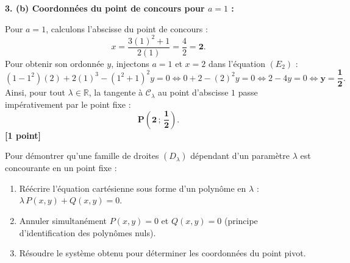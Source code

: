 \documentclass[11pt,a4paper]{article}
\newcommand{\R}{\mathbb{R}}
\begin{document}
\begin{correctionbox}
\medskip
\textbf{3. (b) Coordonnées du point de concours pour $a = 1$ :}

Pour $a = 1$, calculons l'abscisse du point de concours :
\[
x = \frac{3(1)^2 + 1}{2(1)} = \frac{4}{2} = \mathbf{2}.
\]
Pour obtenir son ordonnée $y$, injectons $a = 1$ et $x = 2$ dans l'équation $(E_2)$ :
\[
(1 - 1^2)(2) + 2(1)^3 - (1^2 + 1)^2 y = 0 \iff 0 + 2 - (2)^2 y = 0 \iff 2 - 4y = 0 \iff \mathbf{y = \frac{1}{2}}.
\]
Ainsi, pour tout $\lambda \in \R$, la tangente à $\mathcal{C}_\lambda$ au point d'abscisse $1$ passe impérativement par le point fixe :
\[
\mathbf{P\left(2\,;\,\frac{1}{2}\right)}.
\] \hfill \textbf{[1 point]}
\end{correctionbox}

\begin{alertebox}
Pour démontrer qu'une famille de droites $(D_\lambda)$ dépendant d'un paramètre $\lambda$ est concourante en un point fixe :
\begin{enumerate}
    \item Réécrire l'équation cartésienne sous forme d'un polynôme en $\lambda$ : $\lambda \, P(x,y) + Q(x,y) = 0$.
    \item Annuler simultanément $P(x,y) = 0$ et $Q(x,y) = 0$ (principe d'identification des polynômes nuls).
    \item Résoudre le système obtenu pour déterminer les coordonnées du point pivot.
\end{enumerate}
\end{alertebox}
\end{document}
